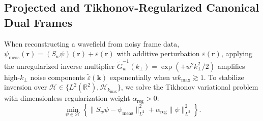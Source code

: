 \documentclass[aps,pra,onecolumn,notitlepage,11pt,tightenlines,nofootinbib,floatfix,longbibliography]{revtex4-2}
\theoremstyle{remark}
\newcommand{\norm}[1]{\lVert #1 \rVert}
\begin{document}
\subsection{Projected and Tikhonov-Regularized Canonical Dual Frames}
\label{subsec:tikhonov_dual}

When reconstructing a wavefield from noisy frame data, $\psi_{\mathrm{meas}}(\mathbf{r}) = (S_w\psi)(\mathbf{r}) + \varepsilon(\mathbf{r})$ with additive perturbation $\varepsilon(\mathbf{r})$, applying the unregularized inverse multiplier $\widetilde{G}_w^{-1}(k_\perp) = \exp(+w^2 k_\perp^2/2)$ amplifies high-$k_\perp$ noise components $\widetilde{\varepsilon}(\mathbf{k})$ exponentially when $w k_{\max} \gtrsim 1$. To stabilize inversion over $\mathcal{H} \in \{L^2(\mathbb{R}^2), \mathcal{H}_{k_{\max}}\}$, we solve the Tikhonov variational problem with dimensionless regularization weight $\alpha_{\mathrm{reg}} > 0$:
\begin{equation}
\min_{\psi \in \mathcal{H}} \left\{ \norm{S_w\psi - \psi_{\mathrm{meas}}}_{L^2}^2 + \alpha_{\mathrm{reg}}\norm{\psi}_{L^2}^2 \right\}.
\label{eq:tikhonov_opt}
\end{equation}
\end{document}
